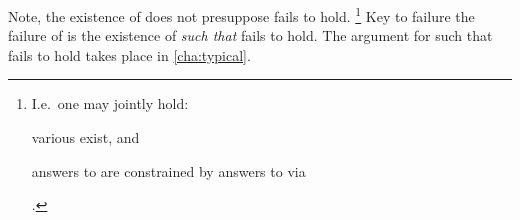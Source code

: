 \begin{note}

  Note, the existence of  does not presuppose \issueInclusion{} fails to hold.%
  \footnote{
    I.e.\ one may jointly hold:
    \begin{enumerate*}[label=(\alph*)]
    \item
      various  exist, and
    \item
      answers to \qWhy{} are constrained by answers to \qHow{} via \issueInclusion{}
    \end{enumerate*}%
    .
  }
  Key to failure the failure of \issueInclusion{} is the existence of  \emph{such that} \issueInclusion{} fails to hold.
  The argument for  such that \issueInclusion{} fails to hold takes place in \autoref{cha:typical}.
\end{note}






